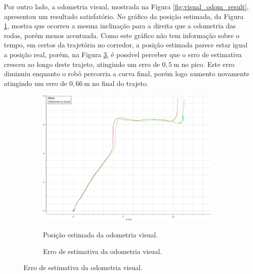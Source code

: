 \documentclass[repeatfields,xlists,xpacks,oneside,yearsonly]{ufrgscca}
\begin{document}
Por outro lado, a odometria visual, mostrada na Figura
\ref{fig:visual_odom_result}, apresentou um resultado satisfatório.
No gráfico da posição estimada, da Figura \ref{fig:odom_visual},
mostra que ocorreu a mesma inclinação para a direita que a odometria
das rodas, porém menos acentuada. Como este gráfico não tem
informação sobre o tempo, em certos da trajetória no corredor, a
posição estimada parece estar igual a posição real, porém, na Figura
\ref{fig:odom_visual_error}, é possível perceber que o erro de
estimativa cresceu ao longo deste trajeto, atingindo um erro de
$0,5~\si{\meter}$ no pico. Este erro diminuiu enquanto o robô
percorria a curva final, porém logo aumento novamente atingindo um
erro de $0,66~\si{\meter}$ no final do trajeto.

\begin{figure}[h]
    \caption{Resultado da odometria visual.}
    \label{fig:visual_odom_result}
    \begin{subfigure}{0.5\linewidth}
        {
            \centering
            \caption{Posição estimada da odometria visual.}
            \label{fig:odom_visual}
            \includegraphics[width=0.98\linewidth]{odom-visual.png}\\
        }
    \end{subfigure}
    \begin{subfigure}{0.5\linewidth}
        {
            \centering
            \caption{Erro de estimativa da odometria visual.}
            \label{fig:odom_visual_error}
}
\end{subfigure}
\end{figure}
\end{document}
